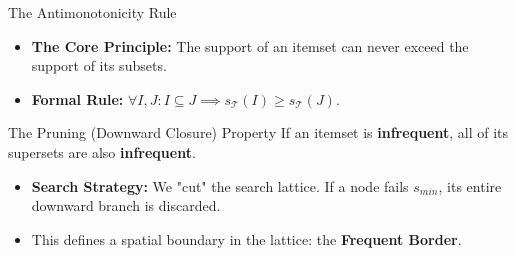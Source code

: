 \begin{frame}{The Antimonotonicity Rule}
    \begin{itemize}
        \item \textbf{The Core Principle:} The support of an itemset can never exceed the support of its subsets.
        \item \textbf{Formal Rule:} $\forall I, J: I \subseteq J \implies s_{\mathcal{T}}(I) \geq s_{\mathcal{T}}(J)$.
    \end{itemize}

    \vfill

    \begin{alertblock}{The Pruning (Downward Closure) Property}
        \centering
        If an itemset is \textbf{infrequent}, all of its supersets are also \textbf{infrequent}.
    \end{alertblock}

    \vfill

    \begin{itemize}
        \item \textbf{Search Strategy:} We "cut" the search lattice. If a node fails $s_{min}$, its entire downward branch is discarded.
        \item This defines a spatial boundary in the lattice: the \textbf{Frequent Border}.
    \end{itemize}
\end{frame}

